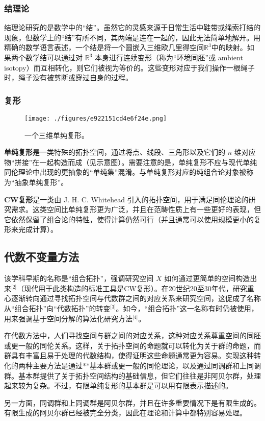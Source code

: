 \subsubsection{结理论}
结理论研究的是数学中的“结”。虽然它的灵感来源于日常生活中鞋带或绳索打结的现象，但数学上的“结”有所不同，其两端是连在一起的，因此无法简单地解开。用精确的数学语言表述，一个结是将一个圆嵌入三维欧几里得空间$\mathbb{R}^3$中的映射。如果两个数学结可以通过对 $\mathbb{R}^3$ 本身进行连续变形（称为“环境同胚”或 ambient isotopy）而互相转化，则它们被视为等价的。这些变形对应于我们操作一根绳子时，绳子没有被剪断或穿过自身的过程。
\subsubsection{复形}
\begin{figure}[ht]
\centering
\texttt{[image: ./figures/e922151cd4e6f24e.png]}
\caption{一个三维单纯复形。} \label{fig_DSTP_2}
\end{figure}
\textbf{单纯复形}是一类特殊的拓扑空间，通过将点、线段、三角形以及它们的 $n$ 维对应物“拼接”在一起构造而成（见示意图）。需要注意的是，单纯复形不应与现代单纯同伦理论中出现的更抽象的“单纯集”混淆。与单纯复形对应的纯组合论对象被称为“抽象单纯复形”。

\textbf{CW复形}是一类由 J. H. C. Whitehead 引入的拓扑空间，用于满足同伦理论的研究需求。这类空间比单纯复形更为广泛，并且在范畴性质上有一些更好的表现，但它依然保留了组合论的特性，使得计算仍然可行（并且通常可以使用规模更小的复形来完成计算）。
\subsection{代数不变量方法}
该学科早期的名称是“组合拓扑”，强调研究空间 $X$ 如何通过更简单的空间构造出来\(^\text{[2]}\)（现代用于此类构造的标准工具是CW复形）。在20世纪20至30年代，研究重心逐渐转向通过寻找拓扑空间与代数群之间的对应关系来研究空间，这促成了名称从“组合拓扑”向“代数拓扑”的转变\(^\text{[3]}\)。如今，“组合拓扑”这一名称有时仍被使用，用来强调基于空间分解的算法化研究方法\(^\text{[4]}\)。

在代数方法中，人们寻找空间与群之间的对应关系，这种对应关系尊重空间的同胚或更一般的同伦关系。这样，关于拓扑空间的命题就可以转化为关于群的命题，而群具有丰富且易于处理的代数结构，使得证明这些命题通常更为容易。实现这种转化的两种主要方法是通过**基本群或更一般的同伦理论，以及通过同调群和上同调群。基本群提供了关于拓扑空间结构的基础信息，但它们往往是非阿贝尔群，处理起来较为复杂。不过，有限单纯复形的基本群是可以用有限表示描述的。

另一方面，同调群和上同调群是阿贝尔群，并且在许多重要情况下是有限生成的。有限生成的阿贝尔群已经被完全分类，因此在理论和计算中都特别容易处理。
